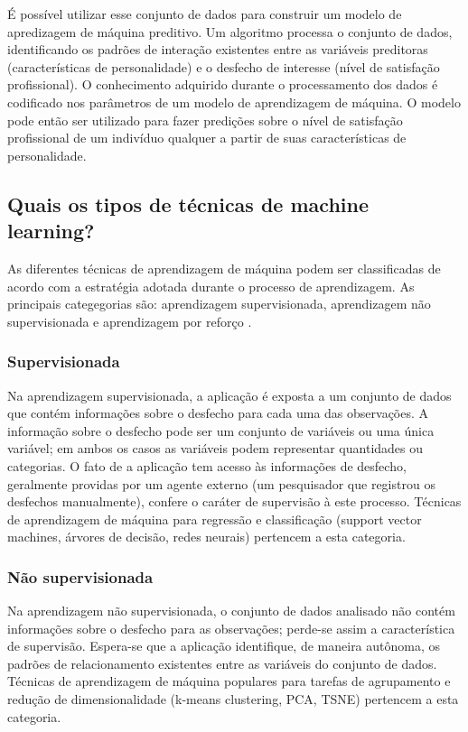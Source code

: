 É possível utilizar esse conjunto de dados para construir um modelo de apredizagem de máquina preditivo. Um algoritmo processa o conjunto de dados,
identificando os padrões de interação existentes entre as variáveis preditoras (características de personalidade) e o desfecho de interesse (nível
de satisfação profissional). O conhecimento adquirido durante o processamento dos dados é codificado nos parâmetros de um modelo de aprendizagem de
máquina. O modelo pode então ser utilizado para fazer predições sobre o nível de satisfação profissional de um indivíduo qualquer a partir de suas
características de personalidade.

\subsection{Quais os tipos de técnicas de machine learning?}
As diferentes técnicas de aprendizagem de máquina podem ser classificadas de acordo com a estratégia adotada
durante o processo de aprendizagem. As principais categegorias são: aprendizagem supervisionada, aprendizagem não
supervisionada e aprendizagem por reforço \cite{Bi2019}.

\subsubsection{Supervisionada}
Na aprendizagem supervisionada, a aplicação é exposta a um conjunto de dados que contém informações sobre o desfecho
para cada uma das observações. A informação sobre o desfecho pode ser um conjunto de variáveis ou uma única variável;
em ambos os casos as variáveis podem representar quantidades ou categorias. O fato de a aplicação tem acesso às informações
de desfecho, geralmente providas por um agente externo (um pesquisador que registrou os desfechos manualmente), confere o
caráter de supervisão à este processo. Técnicas de aprendizagem de máquina para regressão e classificação (support vector
machines, árvores de decisão, redes neurais) pertencem a esta categoria.

\subsubsection{Não supervisionada}
Na aprendizagem não supervisionada, o conjunto de dados analisado não contém informações sobre o desfecho para
as observações; perde-se assim a característica de supervisão. Espera-se que a aplicação identifique, de maneira
autônoma, os padrões de relacionamento existentes entre as variáveis do conjunto de dados. Técnicas de aprendizagem de
máquina populares para tarefas de agrupamento e redução de dimensionalidade (k-means clustering, PCA, TSNE) pertencem
a esta categoria.

